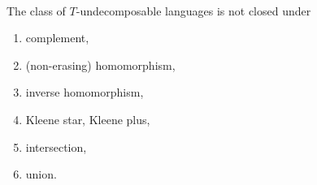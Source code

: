 \paragraph{}
\cveta The class of $T$-undecomposable languages is not closed under 
\begin{enumerate}
\item complement,
\item (non-erasing) homomorphism,
\item inverse homomorphism,
\item Kleene star, Kleene plus,
\item intersection,
\item union.
\end{enumerate}

\paragraph{}
\dokaz

